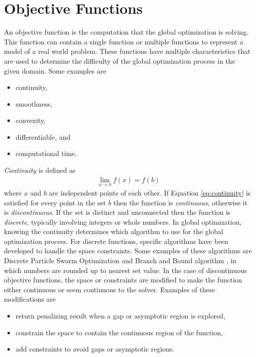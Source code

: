 \section{Objective Functions}
An objective function is the computation that the global optimization is solving. This function can contain a single function or multiple functions to represent a model of a real world problem. These functions have multiple characteristics that are used to determine the difficulty of the global optimization process in the given domain. Some examples are
\begin{itemize}
  \item continuity,
  \item smoothness,
  \item convexity,
  \item differentiable, and
  \item computational time.
\end{itemize}
\textit{Continuity} is defined as  
\begin{align}
  \label{eq:continuity}
  \lim_{x\rightarrow b} f(x) = f(b)
\end{align}
where $x$ and $b$ are independent points of each other. If Equation \ref{eq:continuity} is satisfied for every point in the set $b$ then the function is \textit{continuous}, otherwise it is \textit{discontinuous}. If the set is distinct and unconnected then the function is \textit{discrete}, typically involving integers or whole numbers. In global optimization, knowing the continuity determines which algorithm to use for the global optimization process. For discrete functions,
specific algorithms have been developed to handle the space constraints. Some examples of these algorithms are Discrete Particle Swarm Optimization \cite{Kaveh2014} and Branch and Bound algorithm \cite{Liberti2000}, in which numbers are rounded up to nearest set value. In the case of discontinuous objective functions, the space or constraints are modified to make the function either continuous or seem continuous to the solver. Examples of these modifications are
\begin{itemize}
    \item return penalizing result when a gap or asymptotic region is explored,
    \item constrain the space to contain the continuous region of the function,
    \item add constraints to avoid gaps or asymptotic regions.
\end{itemize}

